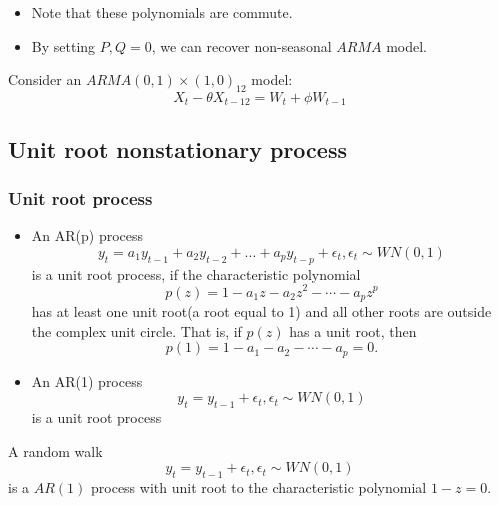 \begin{remark}\hfill
\begin{itemize}
    \item Note that these polynomials are commute.
    \item By setting $P,Q=0$, we can recover non-seasonal $ARMA$ model.
\end{itemize}
\end{remark}

\begin{example}
Consider an $ARMA(0,1)\times(1,0)_{12}$ model:
$$X_t -\theta X_{t-12} = W_t + \phi W_{t-1}$$
\end{example}


\subsection{Unit root nonstationary process}
\subsubsection{Unit root process}

\begin{definition}\hfill
\begin{itemize}
	\item An AR(p) process 
	$$y_t = a_1y_{t-1} + a_2y_{t-2} + ... + a_p y_{t-p} + \epsilon_t,\epsilon_t\sim WN(0,1)$$
	is a unit root process, if the characteristic polynomial 
	$$p(z) = 1-a_1z - a_2z^2 - \cdots - a_p z^p$$
	has at least one unit root(a root equal to 1) and all other roots are outside the complex unit circle. That is, if $p(z)$ has a unit root, then
	$$p(1)=1 - a_1 - a_2 - \cdots - a_p = 0.$$
	\item An AR(1) process
		$$y_t = y_{t-1} + \epsilon_t, \epsilon_t\sim WN(0,1)$$
	is a unit root process
\end{itemize}	
\end{definition}

\begin{example}
A random walk $$y_t = y_{t-1} + \epsilon_t,\epsilon_t\sim WN(0,1)$$
is a $AR(1)$ process with unit root to the characteristic polynomial $1-z = 0$. 
\end{example}

